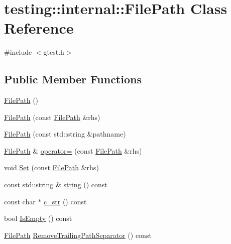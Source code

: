\hypertarget{classtesting_1_1internal_1_1_file_path}{\section{testing\-:\-:internal\-:\-:File\-Path Class Reference}
\label{classtesting_1_1internal_1_1_file_path}
}


{\ttfamily \#include $<$gtest.\-h$>$}

\subsection*{Public Member Functions}
\begin{DoxyCompactItemize}
\item 
\hyperlink{classtesting_1_1internal_1_1_file_path_a3504a51accbca78a52fe586133ea5499}{File\-Path} ()
\item 
\hyperlink{classtesting_1_1internal_1_1_file_path_ae9efd0fee56c6e3e2d659b464250b112}{File\-Path} (const \hyperlink{classtesting_1_1internal_1_1_file_path}{File\-Path} \&rhs)
\item 
\hyperlink{classtesting_1_1internal_1_1_file_path_a9fc072b140aa0652a7022fb809fe3abe}{File\-Path} (const std\-::string \&pathname)
\item 
\hyperlink{classtesting_1_1internal_1_1_file_path}{File\-Path} \& \hyperlink{classtesting_1_1internal_1_1_file_path_a8d9c1bafb90f10bcd5611a54d8f326ef}{operator=} (const \hyperlink{classtesting_1_1internal_1_1_file_path}{File\-Path} \&rhs)
\item 
void \hyperlink{classtesting_1_1internal_1_1_file_path_a15a42de7518e89254e0640dd9317d5f7}{Set} (const \hyperlink{classtesting_1_1internal_1_1_file_path}{File\-Path} \&rhs)
\item 
const std\-::string \& \hyperlink{classtesting_1_1internal_1_1_file_path_a7c544a30af67e2da5ce7e625f8402818}{string} () const 
\item 
const char $\ast$ \hyperlink{classtesting_1_1internal_1_1_file_path_a85297234dac0acd936632dff8634c2b9}{c\-\_\-str} () const 
\item 
bool \hyperlink{classtesting_1_1internal_1_1_file_path_a44543ff34ae757038ab20925659b447a}{Is\-Empty} () const 
\item 
\hyperlink{classtesting_1_1internal_1_1_file_path}{File\-Path} \hyperlink{classtesting_1_1internal_1_1_file_path_a952e1b2a9909cdeaf25de5fcdf069b3a}{Remove\-Trailing\-Path\-Separator} () const 
\item 

\end{DoxyCompactItemize}
